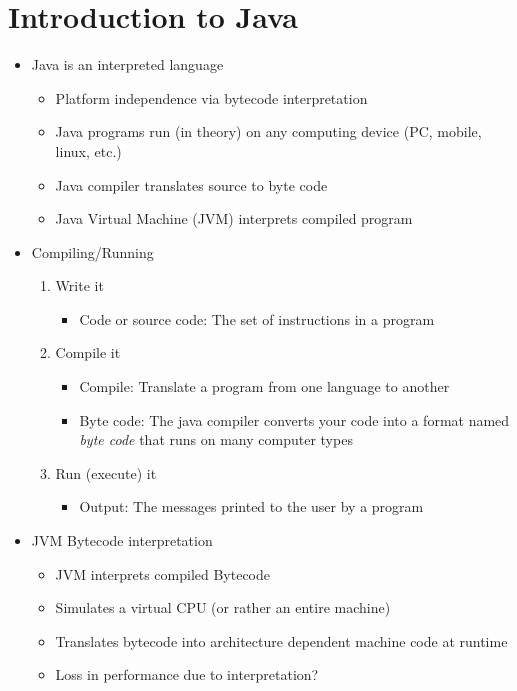 \documentclass[a4paper]{article}
\begin{document}
\section{Introduction to Java}
\begin{itemize}
\item Java is an interpreted language
\begin{itemize}
\item Platform independence via bytecode interpretation
\item Java programs run (in theory) on any computing device (PC, mobile, linux, etc.)
\item Java compiler translates source to byte code
\item Java Virtual Machine (JVM) interprets compiled program
\end{itemize}
\item Compiling/Running
\begin{enumerate}
\item Write it
\begin{itemize}
\item Code or source code: The set of instructions in a program
\end{itemize}
\item Compile it
\begin{itemize}
\item Compile: Translate a program from one language to another
\item Byte code: The java compiler converts your code into a format named \emph{byte code} that runs on many computer types
\end{itemize}
\item Run (execute) it
\begin{itemize}
\item Output: The messages printed to the user by a program
\end{itemize}
\end{enumerate}
\item JVM Bytecode interpretation
\begin{itemize}
\item JVM interprets compiled Bytecode
\item Simulates a virtual CPU (or rather an entire machine)
\item Translates bytecode into architecture dependent machine code at runtime
\item Loss in performance due to interpretation?
\begin{itemize}

\end{itemize}
\end{itemize}
\end{itemize}
\end{document}
